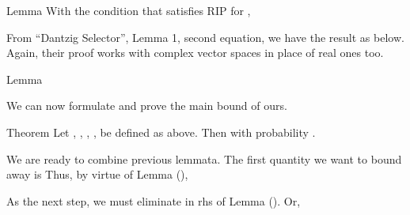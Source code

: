 \Result
{Lemma}
{
With the condition that  satisfies RIP for ,
}

From ``Dantzig Selector'', Lemma 1, second equation, we have the result as below.
Again, their proof works with complex vector spaces in place of real ones too.

\Result
{Lemma}
{
}

\stopsection

\startsection [title={The Main Bound}]

We can now formulate and prove the main bound of ours.

\Result
{Theorem}
{
Let , , , ,  be defined as above.
Then
with probability .
}

We are ready to combine previous lemmata.
The first quantity we want to bound away is
Thus, by virtue of Lemma (),

As the next step, we must eliminate  in rhs of Lemma ().
Or,

